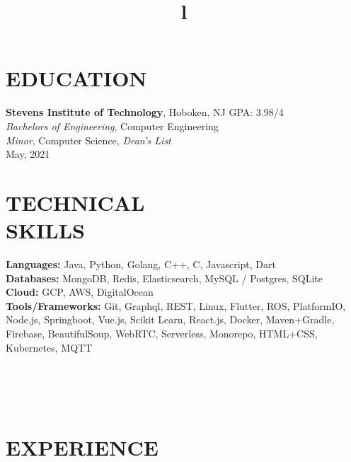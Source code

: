 \documentclass[margin]{res}
\begin{document}
\begin{resume}


\section{EDUCATION}
\textbf{Stevens Institute of Technology}, Hoboken, NJ \hfill GPA: 3.98/4\\
{\sl Bachelors of Engineering}, Computer Engineering\\
{\sl Minor}, Computer Science, {\sl Dean's List}\\
May, 2021

\section{TECHNICAL\\SKILLS}

\textbf{Languages:} Java, Python, Golang, C++, C, Javascript, Dart
\\
\textbf{Databases:} MongoDB, Redis, Elasticsearch, MySQL / Postgres, SQLite
\\
\textbf{Cloud:} GCP, AWS, DigitalOcean
\\
\textbf{Tools/Frameworks:} Git, Graphql, REST, Linux, Flutter, ROS, PlatformIO, Node.js,
Springboot, Vue.js, Scikit Learn, React.js, Docker, Maven+Gradle, Firebase, BeautifulSoup,
WebRTC, Serverless, Monorepo, HTML+CSS, Kubernetes, MQTT

\begin{format}
\title{l}\\
\\
\body\\
\end{format}

\section{EXPERIENCE}


\end{resume}
\end{document}
